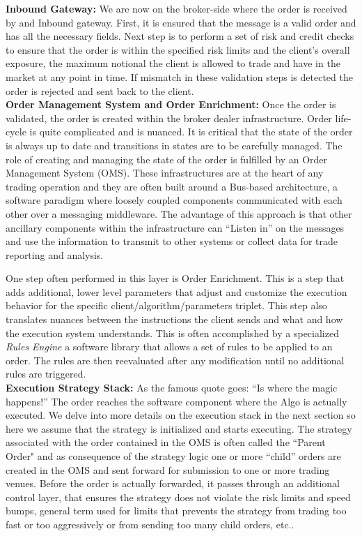 \noindent\textbf{Inbound Gateway:} We are now on the broker-side where the order is received by and Inbound gateway. First, it is ensured that the message is a valid order and has all the necessary fields. Next step is to perform a set of risk and credit checks to ensure that the order is within the specified risk limits and the client's overall exposure, the maximum notional the client is allowed to trade and have in the market at any point in time. If mismatch in these validation steps is detected the order is rejected and sent back to the client. \\


\noindent\textbf{Order Management System and Order Enrichment:} Once the order is validated, the order is created within the broker dealer infrastructure. Order life-cycle is quite complicated and is nuanced. It is critical that the state of the order is always up to date and transitions in states are to be carefully managed. The role of creating and managing the state of the order is fulfilled by an Order Management System (OMS). These infrastructures are at the heart of any trading operation and they are often built around a Bus-based architecture, a software paradigm where loosely coupled components communicated with each other over a messaging middleware. The advantage of this approach is that other ancillary components within the infrastructure can ``Listen in'' on the messages and use the information to transmit to other systems or collect data for trade reporting and analysis.


One step often performed in this layer is Order Enrichment. This is a step that adds additional, lower level parameters that adjust and customize the execution behavior for the specific client/algorithm/parameters triplet. This step also translates nuances between the instructions the client sends and what and how the execution system understands. This is often accomplished by a specialized \emph{Rules Engine} a software library that allows a set of rules to be applied to an order. The rules are then reevaluated after any modification until no additional rules are triggered. \\


\noindent\textbf{Execution Strategy Stack:} As the famous quote goes: ``Is where the magic happens!'' The order reaches the software component where the Algo is actually executed. We delve into more details on the execution stack in the next section so here we assume that the strategy is initialized and starts executing. The strategy associated with the order contained in the OMS is often called the ``Parent Order" and as consequence of the strategy logic one or more ``child'' orders  are created in the OMS and sent forward for submission to one or more trading venues. Before the order is actually forwarded, it passes through an additional control layer, that ensures the strategy does not violate the risk limits and speed bumps, general term used for limits that prevents the strategy from trading too fast or too aggressively or from sending too many child orders, etc.. \\


